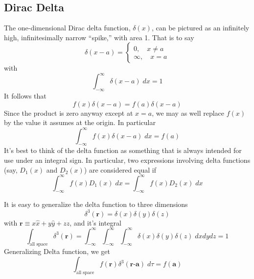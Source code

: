 \documentclass[../main.tex]{subfiles}
\begin{document}
\subsection*{Dirac Delta}
The one-dimensional Dirac delta function, $\delta(x)$, can be pictured as an infinitely high, infinitesimally narrow “spike,” with area 1. That is to say
\begin{equation*}
    \delta (x-a)=\begin{cases}
        0,\quad  x\neq a\\
        \infty,\quad  x=a
    \end{cases}
\end{equation*}
with
\begin{equation*}
    \int_{-\infty}^{\infty} \delta (x-a)\;dx =1
\end{equation*}
It follows that
\begin{equation*}
    f(x)\delta(x-a)=f(a)\delta(x-a)
\end{equation*}
Since the product is zero anyway except at $x = a$, we may as well replace $f (x)$ by the value it assumes at the origin. In particular
\begin{equation*}
    \int_{-\infty}^{\infty}f(x)\delta(x-a)\;dx=f(a)
\end{equation*}
It's best to think of the delta function as something that is always intended for use under an integral sign. In particular, two expressions involving delta functions (say, $D_1(x)$ and $D_2(x)$) are considered equal if
\begin{equation*}
    \int_{-\infty}^{\infty}f(x)D_1(x)\;dx=\int_{-\infty}^{\infty}f(x)D_2(x)\;dx
\end{equation*}

It is easy to generalize the delta function to three dimensions
\begin{equation*}
    \delta^3(\textbf{r})=\delta (x)\delta (y)\delta(z)
\end{equation*}
with $\textbf{r} \equiv x \hat{x} + y\hat{y}+ z \hat{z}$, and it's integral
\begin{equation*}
    \int_{\text{all space}}\delta^3({\textbf{r}})=\int_{-\infty}^{\infty}\int_{-\infty}^{\infty}\int_{-\infty}^{\infty}\delta(x)\delta(y)\delta(z)\;dxdydz=1
\end{equation*}
Generalizing Delta function, we get
\begin{equation*}
    \int_{\text{all space}}f(\textbf{r})\delta^3({\textbf{r-a}})\;d\tau=f(\textbf{a})
\end{equation*}
\end{document}
